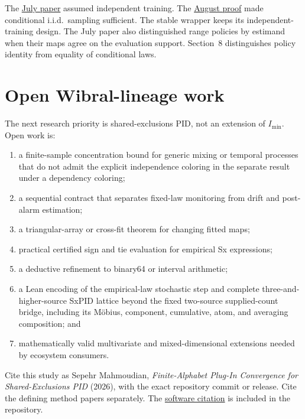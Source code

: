 \documentclass[11pt]{article}
\theoremstyle{definition}
\newcommand{\imin}{I_{\min}}
\begin{document}
The \href{https://github.com/sepahead/pid-rs/blob/7545930454b0e5336cce8497885d05dd4fe4ac2b/FINITE_ALPHABET_PLUGIN_CONVERGENCE.md}{July paper} assumed independent training. The
\href{https://github.com/sepahead/pid-rs/commit/6cbf273c37fc05286aece53b544f14e9fe0de329}{August proof} made conditional i.i.d.\ sampling sufficient. The stable wrapper keeps its independent-training design. The July paper also distinguished range policies by estimand when their maps agree on the evaluation support. Section~8 distinguishes policy identity from equality of conditional laws.

\section{Open Wibral-lineage work}

The next research priority is shared-exclusions PID, not an extension of $\imin$.  Open work is:
\begin{enumerate}
  \item a finite-sample concentration bound for generic mixing or temporal processes that do not admit
    the explicit independence coloring in the separate result under a dependency coloring;
  \item a sequential contract that separates fixed-law monitoring from drift and post-alarm
    estimation;
  \item a triangular-array or cross-fit theorem for changing fitted maps;
  \item practical certified sign and tie evaluation for empirical Sx expressions;
  \item a deductive refinement to binary64 or interval arithmetic;
  \item a Lean encoding of the empirical-law stochastic step and complete three-and-higher-source
    SxPID lattice beyond the fixed two-source supplied-count bridge, including its M{\"o}bius,
    component, cumulative, atom, and averaging composition; and
  \item mathematically valid multivariate and mixed-dimensional extensions needed by ecosystem
    consumers.
\end{enumerate}

Cite this study as Sepehr Mahmoudian, \emph{Finite-Alphabet Plug-In Convergence for
Shared-Exclusions PID} (2026), with the exact repository commit or release. Cite the defining
method papers separately. The \href{https://github.com/sepahead/pid-rs/blob/main/CITATION.cff}{software citation} is included in the repository.
\end{document}
